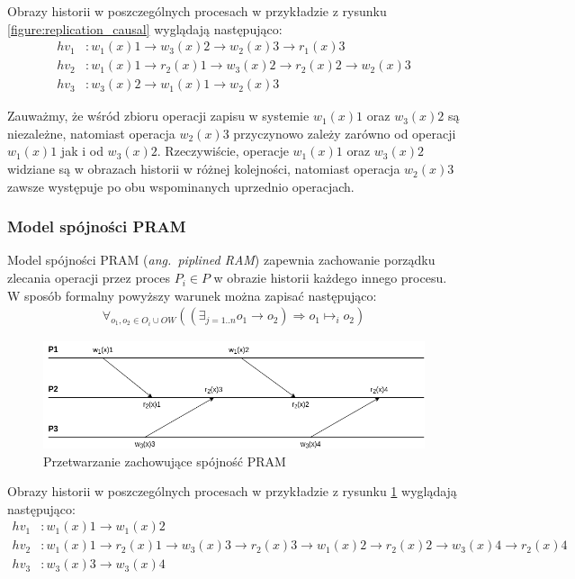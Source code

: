 Obrazy historii w poszczególnych procesach w przykładzie z rysunku \ref{figure:replication_causal} wyglądają następująco:
\begin{align*}
    hv_1&: w_1(x)1 \rightarrow w_3(x)2 \rightarrow w_2(x)3 \rightarrow r_1(x)3 \\
    hv_2&: w_1(x)1 \rightarrow r_2(x)1 \rightarrow w_3(x)2 \rightarrow r_2(x)2 \rightarrow w_2(x)3 \\
    hv_3&: w_3(x)2 \rightarrow w_1(x)1 \rightarrow w_2(x)3
\end{align*}

Zauważmy, że wśród zbioru operacji zapisu w systemie $ w_1(x)1 $ oraz $ w_3(x)2 $ są niezależne, natomiast operacja $ w_2(x)3 $ przyczynowo zależy zarówno od operacji $ w_1(x)1 $ jak i od $ w_3(x)2 $. Rzeczywiście, operacje $ w_1(x)1 $ oraz $ w_3(x)2 $ widziane są w obrazach historii w różnej kolejności, natomiast operacja $ w_2(x)3 $ zawsze występuje po obu wspominanych uprzednio operacjach.

\subsubsection{Model spójności PRAM}

Model spójności PRAM (\textit{ang.\ piplined RAM}) zapewnia zachowanie porządku zlecania operacji przez proces $ P_i \in P $ w obrazie historii każdego innego procesu. W sposób formalny powyższy warunek można zapisać następująco:
\begin{align*}
    \forall_{o_1, o_2 \in O_i \cup OW} ((\exists_{j=1..n} o_1 \rightarrow o_2) \Rightarrow o_1 \mapsto_i o_2)
\end{align*}

\begin{figure}
    \includegraphics[width=\linewidth]{images/02-pram.png}
    \caption{Przetwarzanie zachowujące spójność PRAM}
    \label{figure:replication_pram}
\end{figure}

Obrazy historii w poszczególnych procesach w przykładzie z rysunku \ref{figure:replication_pram} wyglądają następująco:
\begin{align*}
    hv_1&: w_1(x)1 \rightarrow w_1(x)2 \\
    hv_2&: w_1(x)1 \rightarrow r_2(x)1 \rightarrow w_3(x)3 \rightarrow r_2(x)3 \rightarrow w_1(x)2 \rightarrow r_2(x)2 \rightarrow w_3(x)4 \rightarrow r_2(x)4 \\
    hv_3&: w_3(x)3 \rightarrow w_3(x)4
\end{align*}

